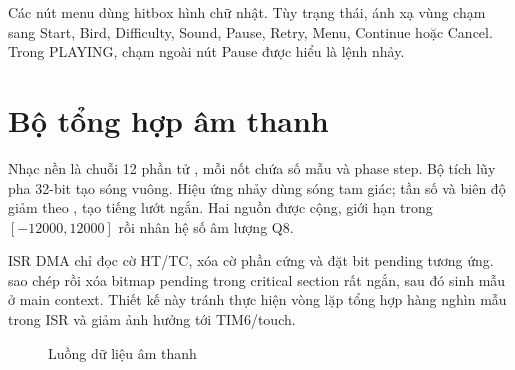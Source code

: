 Các nút menu dùng hitbox hình chữ nhật. Tùy trạng thái,  ánh xạ vùng chạm sang Start, Bird, Difficulty, Sound, Pause, Retry, Menu, Continue hoặc Cancel. Trong PLAYING, chạm ngoài nút Pause được hiểu là lệnh nhảy.

\section{Bộ tổng hợp âm thanh}

Nhạc nền là chuỗi 12 phần tử , mỗi nốt chứa số mẫu và phase step. Bộ tích lũy pha 32-bit tạo sóng vuông. Hiệu ứng nhảy dùng sóng tam giác; tần số và biên độ giảm theo , tạo tiếng lướt ngắn. Hai nguồn được cộng, giới hạn trong $[-12000,12000]$ rồi nhân hệ số âm lượng Q8.

ISR DMA chỉ đọc cờ HT/TC, xóa cờ phần cứng và đặt bit pending tương ứng.  sao chép rồi xóa bitmap pending trong critical section rất ngắn, sau đó sinh mẫu ở main context. Thiết kế này tránh thực hiện vòng lặp tổng hợp hàng nghìn mẫu trong ISR và giảm ảnh hưởng tới TIM6/touch.

\begin{figure}[H]
  \centering
  \caption{Luồng dữ liệu âm thanh}
  \label{fig:audio-flow}
\end{figure}
